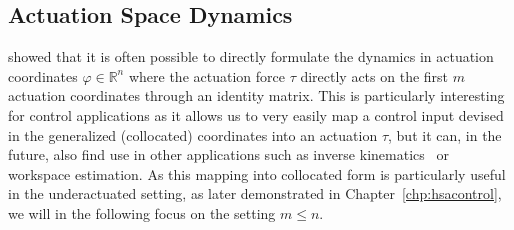 \subsection{Actuation Space Dynamics}\label{sub:background:dynamics:actuation_space}
\citet{pustina2024input} showed that it is often possible to directly formulate the dynamics in actuation coordinates $\varphi \in \mathbb{R}^n$ where the actuation force $\tau$ directly acts on the first $m$ actuation coordinates through an identity matrix. This is particularly interesting for control applications as it allows us to very easily map a control input devised in the generalized (collocated) coordinates into an actuation $\tau$, but it can, in the future, also find use in other applications such as inverse kinematics~\citep{della2025pushing} or workspace estimation. As this mapping into collocated form is particularly useful in the underactuated setting, as later demonstrated in Chapter~\ref{chp:hsacontrol}, we will in the following focus on the setting $m \leq n$.

